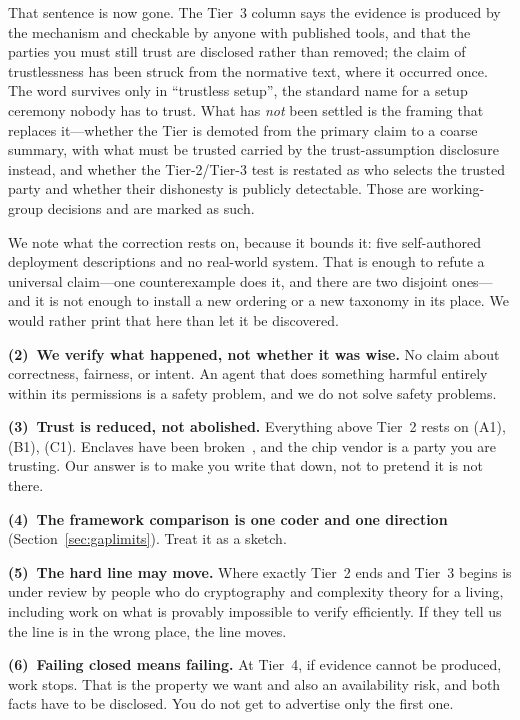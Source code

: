 \documentclass[11pt]{article}
\begin{document}
That sentence is now gone. The Tier~3 column says the evidence is produced by
the mechanism and checkable by anyone with published tools, and that the parties
you must still trust are disclosed rather than removed; the claim of
trustlessness has been struck from the normative text, where it occurred once.
The word survives only in ``trustless setup'', the standard name for a setup
ceremony nobody has to trust.
What has \emph{not} been settled is the framing that replaces it---whether the
Tier is demoted from the primary claim to a coarse summary, with what must be
trusted carried by the trust-assumption disclosure instead, and whether the
Tier-2/Tier-3 test is restated as who selects the trusted party and whether
their dishonesty is publicly detectable. Those are working-group decisions and
are marked as such.

We note what the correction rests on, because it bounds it: five self-authored
deployment descriptions and no real-world system. That is enough to refute a
universal claim---one counterexample does it, and there are two disjoint
ones---and it is not enough to install a new ordering or a new taxonomy in its
place. We would rather print that here than let it be discovered.

\textbf{(2)~We verify what happened, not whether it was wise.} No claim about
correctness, fairness, or intent. An agent that does something harmful
entirely within its permissions is a safety problem, and we do not solve
safety problems.

\textbf{(3)~Trust is reduced, not abolished.} Everything above Tier~2 rests on
(A1), (B1), (C1). Enclaves have been broken~\cite{costan2016,foreshadow}, and
the chip vendor is a party you are trusting. Our answer is to make you write
that down, not to pretend it is not there.

\textbf{(4)~The framework comparison is one coder and one direction}
(Section~\ref{sec:gaplimits}). Treat it as a sketch.

\textbf{(5)~The hard line may move.} Where exactly Tier~2 ends and Tier~3
begins is under review by people who do cryptography and complexity theory for
a living, including work on what is provably impossible to verify efficiently.
If they tell us the line is in the wrong place, the line moves.

\textbf{(6)~Failing closed means failing.} At Tier~4, if evidence cannot be
produced, work stops. That is the property we want and also an availability
risk, and both facts have to be disclosed. You do not get to advertise only
the first one.
\end{document}
